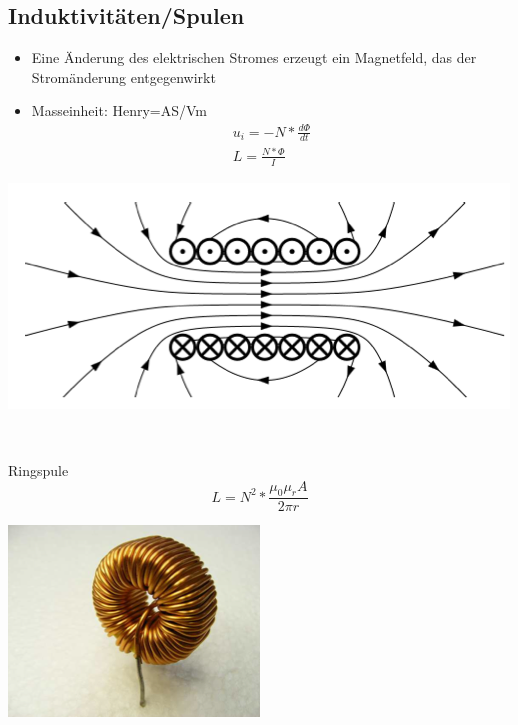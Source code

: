 \subsection{Induktivitäten/Spulen}
\begin{minipage}{9cm}
\begin{itemize}
  \item Eine Änderung des elektrischen Stromes erzeugt ein Magnetfeld, das der
  Stromänderung entgegenwirkt
  \item Masseinheit: Henry=AS/Vm
  \begin{gather}
  u_{i}=-N*\frac{d\Phi}{dt}\\
  L=\frac{N*\Phi}{I}
  \end{gather}
\end{itemize}
\end{minipage}
\begin{minipage}{9cm}
\includegraphics[scale=0.4]{pictures/induktivitaet}
\end{minipage}
\\
\begin{minipage}{9cm}
Ringspule\\
\begin{equation}
L=N^2*\frac{\mu_{0}\mu_{r}A}{2\pi r}
\end{equation}
\end{minipage}
\begin{minipage}{9cm}
\includegraphics[scale=0.4]{pictures/ringspule}
\end{minipage}
